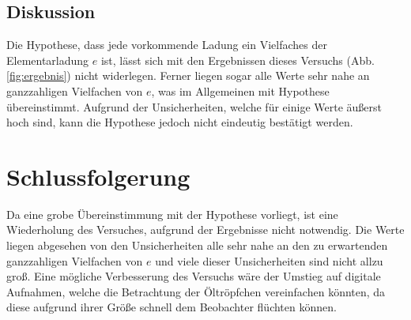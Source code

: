 \subsection{Diskussion}

Die Hypothese, dass jede vorkommende Ladung ein Vielfaches der Elementarladung $e$ ist, lässt sich mit den Ergebnissen dieses Versuchs (Abb. \ref{fig:ergebnis}) nicht widerlegen.
Ferner liegen sogar alle Werte sehr nahe an ganzzahligen Vielfachen von $e$, was im Allgemeinen mit Hypothese übereinstimmt.
Aufgrund der Unsicherheiten, welche für einige Werte äußerst hoch sind, kann die Hypothese jedoch nicht eindeutig bestätigt werden. 

\section{Schlussfolgerung}

Da eine grobe Übereinstimmung mit der Hypothese vorliegt, ist eine Wiederholung des Versuches, aufgrund der Ergebnisse nicht notwendig.
Die Werte liegen abgesehen von den Unsicherheiten alle sehr nahe an den zu erwartenden ganzzahligen Vielfachen von $e$ und viele dieser Unsicherheiten sind nicht allzu groß.
Eine mögliche Verbesserung des Versuchs wäre der Umstieg auf digitale Aufnahmen, welche die Betrachtung der Öltröpfchen vereinfachen könnten, da diese aufgrund ihrer Größe schnell dem Beobachter flüchten können. 

